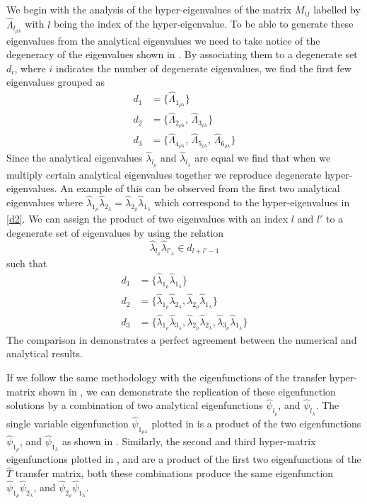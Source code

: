 We begin with the analysis of the hyper-eigenvalues of the matrix $M_{ij}$ labelled by $\hat{\Lambda}_{l_{\rho\lambda}}$ with $l$ being the index of the hyper-eigenvalue. To be able to generate these eigenvalues from the analytical eigenvalues we need to take notice of the degeneracy of the eigenvalues shown in . By associating them to a degenerate set $d_{i}$, where $i$ indicates the number of degenerate eigenvalues, we find the first few eigenvalues grouped as
%
\begin{align}
d_{1}&=\{\hat{\Lambda}_{1_{\rho\lambda}}\}\label{d1}\\
d_{2}&=\{\hat{\Lambda}_{2_{\rho\lambda}},\,\hat{\Lambda}_{3_{\rho\lambda}}\}\label{d2}\\
d_{3}&=\{\hat{\Lambda}_{4_{\rho\lambda}},\,\hat{\Lambda}_{5_{\rho\lambda}},\,\hat{\Lambda}_{6_{\rho\lambda}}\label{d3}\}
\end{align}
%
Since the analytical eigenvalues $\hat{\lambda}_{l_{\rho}}$ and $\hat{\lambda}_{l_{\lambda}}$ are equal we find that when we multiply certain analytical eigenvalues together we reproduce degenerate hyper-eigenvalues. An example of this can be observed from the first two analytical eigenvalues where $\hat{\lambda}_{1_{\rho}}\hat{\lambda}_{2_{\lambda}}=\hat{\lambda}_{2_{\rho}}\hat{\lambda}_{1_{\lambda}}$ which correspond to the hyper-eigenvalues in \eqref{d2}. We can assign the product of two eigenvalues with an index $l$ and $l'$ to a degenerate set of eigenvalues by using the relation
%
\begin{equation}
\hat{\lambda}_{l_{\rho}}\hat{\lambda}_{l'_{\lambda}} \in d_{l+l'-1}
\end{equation}
%
such that
%
\begin{align}
d_{1}&=\{\hat{\lambda}_{1_{\rho}}\hat{\lambda}_{1_{\lambda}}\}\\
d_{2}&=\{\hat{\lambda}_{1_{\rho}}\hat{\lambda}_{2_{\lambda}},\hat{\lambda}_{2_{\rho}}\hat{\lambda}_{1_{\lambda}}\}\\
d_{3}&=\{\hat{\lambda}_{1_{\rho}}\hat{\lambda}_{3_{\lambda}},\hat{\lambda}_{2_{\rho}}\hat{\lambda}_{2_{\lambda}},\hat{\lambda}_{3_{\rho}}\hat{\lambda}_{1_{\lambda}}\}
\end{align}
% 
The comparison in  demonstrates a perfect agreement between the numerical and analytical results. 

If we follow the same methodology with the eigenfunctions of the transfer hyper-matrix shown in , we can demonstrate the replication of these eigenfunction solutions by a combination of two analytical eigenfunctions $\hat{\psi}_{l_{\rho}}$, and $\hat{\psi}_{l_{\lambda}}$. The single variable eigenfunction $\hat{\psi}_{1_{\rho\lambda}}$ plotted in  is a product of the two eigenfunctions $\hat{\psi}_{1_{\rho}}$, and $\hat{\psi}_{1_{\lambda}}$ as shown in . Similarly, the second and third hyper-matrix eigenfunctions plotted in , and  are a product of the first two eigenfunctions of the $\hat{T}$ transfer matrix, both these combinations produce the same eigenfunction $\hat{\psi}_{1_{\rho}}\hat{\psi}_{2_{\lambda}}$, and $\hat{\psi}_{2_{\rho}}\hat{\psi}_{1_{\lambda}}$. 

